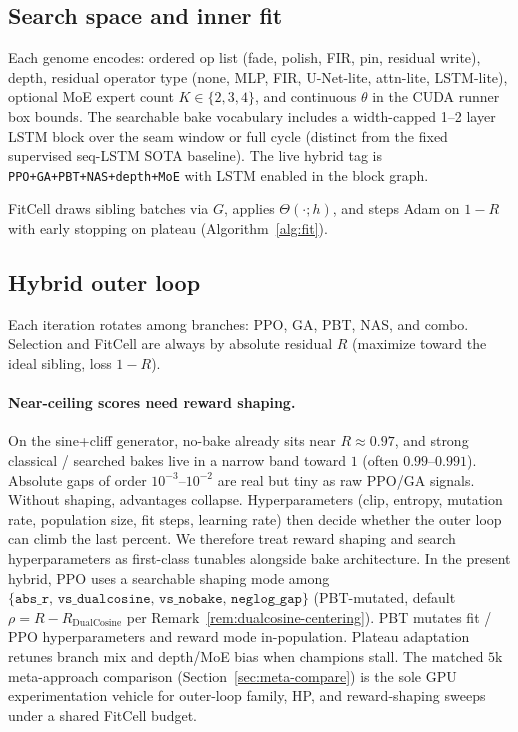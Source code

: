 

\subsection{Search space and inner fit}
\label{sec:search-space}

Each genome encodes: ordered op list (fade, polish, FIR, pin, residual write), depth, residual operator type (none, MLP, FIR, U-Net-lite, attn-lite, LSTM-lite), optional MoE expert count $K\in\{2,3,4\}$, and continuous $\theta$ in the CUDA runner box bounds.
The searchable bake vocabulary includes a width-capped 1--2 layer LSTM block over the seam window or full cycle (distinct from the fixed supervised seq-LSTM SOTA baseline).
The live hybrid tag is \texttt{PPO+GA+PBT+NAS+depth+MoE} with LSTM enabled in the block graph.

FitCell draws sibling batches via $G$, applies $\Theta(\cdot;h)$, and steps Adam on $1-R$ with early stopping on plateau (Algorithm~\ref{alg:fit}).

\subsection{Hybrid outer loop}
\label{sec:hybrid}

Each iteration rotates among branches: PPO, GA, PBT, NAS, and combo.
Selection and FitCell are always by absolute residual $R$ (maximize toward the ideal sibling, loss $1-R$).

\paragraph{Near-ceiling scores need reward shaping.}
\label{sec:reward-shaping}
On the sine{+}cliff generator, no-bake already sits near $R\approx 0.97$, and strong classical / searched bakes live in a narrow band toward $1$ (often $0.99$--$0.991$).
Absolute gaps of order $10^{-3}$--$10^{-2}$ are real but tiny as raw PPO/GA signals.
Without shaping, advantages collapse.
Hyperparameters (clip, entropy, mutation rate, population size, fit steps, learning rate) then decide whether the outer loop can climb the last percent.
We therefore treat reward shaping and search hyperparameters as first-class tunables alongside bake architecture.
In the present hybrid, PPO uses a searchable shaping mode among $\{\texttt{abs\_r},\,\texttt{vs\_dualcosine},\,\texttt{vs\_nobake},\,\texttt{neglog\_gap}\}$ (PBT-mutated, default $\rho = R - R_{\mathrm{DualCosine}}$ per Remark~\ref{rem:dualcosine-centering}).
PBT mutates fit / PPO hyperparameters and reward mode in-population. Plateau adaptation retunes branch mix and depth/MoE bias when champions stall.
The matched $5$k meta-approach comparison (Section~\ref{sec:meta-compare}) is the sole GPU experimentation vehicle for outer-loop family, HP, and reward-shaping sweeps under a shared FitCell budget.

